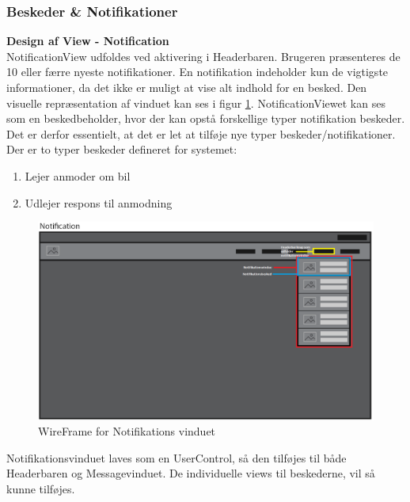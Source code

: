 \documentclass[Rapport/Rapport_main.tex]{subfiles}
\begin{document}
\subsubsection{Beskeder \& Notifikationer}
\textbf{Design af View - Notification}\\
NotificationView udfoldes ved aktivering i Headerbaren. Brugeren præsenteres de 10 eller færre nyeste notifikationer. En notifikation indeholder kun de vigtigste informationer, da det ikke er muligt at vise alt indhold for en besked. Den visuelle repræsentation af vinduet kan ses i figur \ref{fig:wire_noti}. NotificationViewet kan ses som en beskedbeholder, hvor der kan opstå forskellige typer notifikation beskeder. Det er derfor essentielt, at det er let at tilføje nye typer beskeder/notifikationer. Der er to typer beskeder defineret for systemet: 
\begin{enumerate}
    \item Lejer anmoder om bil 
    \item Udlejer respons til anmodning
\end{enumerate}
\begin{figure}[H]
    \centering
    \includegraphics[width=\textwidth]{SoftwareDesign/MVVMDesigns/Graphics/noti_wirefame.png}
    \caption{WireFrame for Notifikations vinduet}
    \label{fig:wire_noti}
\end{figure}
Notifikationsvinduet laves som en UserControl, så den tilføjes til både Headerbaren og Messagevinduet. De individuelle views til beskederne, vil så kunne tilføjes.
\end{document}
